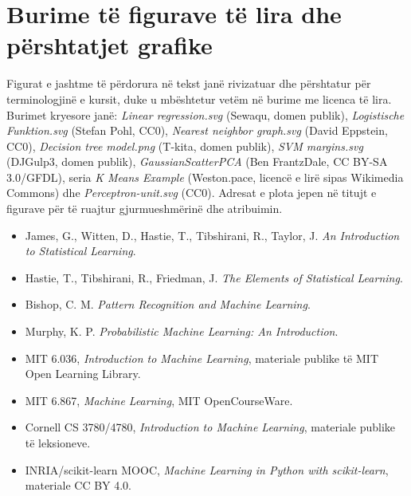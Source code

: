 \documentclass[12pt,a4paper,oneside]{book}
\begin{document}
\section*{Burime të figurave të lira dhe përshtatjet grafike}
Figurat e jashtme të përdorura në tekst janë rivizatuar dhe përshtatur për terminologjinë e kursit, duke u mbështetur vetëm në burime me licenca të lira. Burimet kryesore janë: \emph{Linear regression.svg} (Sewaqu, domen publik), \emph{Logistische Funktion.svg} (Stefan Pohl, CC0), \emph{Nearest neighbor graph.svg} (David Eppstein, CC0), \emph{Decision tree model.png} (T-kita, domen publik), \emph{SVM margins.svg} (DJGulp3, domen publik), \emph{GaussianScatterPCA} (Ben FrantzDale, CC BY-SA 3.0/GFDL), seria \emph{K Means Example} (Weston.pace, licencë e lirë sipas Wikimedia Commons) dhe \emph{Perceptron-unit.svg} (CC0). Adresat e plota jepen në titujt e figurave për të ruajtur gjurmueshmërinë dhe atribuimin.
\begin{itemize}
\item James, G., Witten, D., Hastie, T., Tibshirani, R., Taylor, J. \emph{An Introduction to Statistical Learning}.
\item Hastie, T., Tibshirani, R., Friedman, J. \emph{The Elements of Statistical Learning}.
\item Bishop, C. M. \emph{Pattern Recognition and Machine Learning}.
\item Murphy, K. P. \emph{Probabilistic Machine Learning: An Introduction}.
\item MIT 6.036, \emph{Introduction to Machine Learning}, materiale publike të MIT Open Learning Library.
\item MIT 6.867, \emph{Machine Learning}, MIT OpenCourseWare.
\item Cornell CS 3780/4780, \emph{Introduction to Machine Learning}, materiale publike të leksioneve.
\item INRIA/scikit-learn MOOC, \emph{Machine Learning in Python with scikit-learn}, materiale CC BY 4.0.
\end{itemize}
\end{document}
